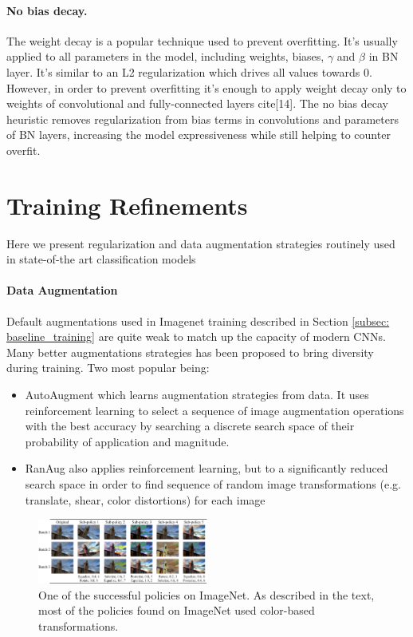 \paragraph{No bias decay.}
The weight decay is a popular technique used to prevent overfitting. It's usually applied to all parameters in the model, including weights, biases, $\gamma$ and $\beta$ in BN layer. It's similar to an L2 regularization which drives all values towards $0$. However, in order to prevent overfitting it's enough to apply weight decay only to weights of convolutional and fully-connected layers cite[14]. The no bias decay heuristic removes regularization from bias terms in convolutions and parameters of BN layers, increasing the model expressiveness while still helping to counter overfit.  


\section{Training Refinements}

Here we present regularization and data augmentation strategies routinely used in state-of-the art classification models \cite{lin2020neural_genet} \cite{tan2019_efficientnet} \cite{tan2021_efficientnetv2}

\paragraph{Data Augmentation}
Default augmentations used in Imagenet training described in Section \ref{subsec: baseline_training} are quite weak to match up the capacity of modern CNNs. Many better augmentations strategies has been proposed to bring diversity during training. Two most popular being: 

\begin{itemize}
    \item AutoAugment \cite{cubuk2018_autoaugment} which learns augmentation strategies from data. It uses reinforcement learning to select a sequence of image augmentation operations with the best accuracy by searching a discrete search space of their probability of application and magnitude.
    \item RanAug \cite{cubuk2020_randaugment} also applies reinforcement learning, but to a significantly reduced search space in order to find sequence of random image transformations (e.g. translate, shear, color distortions) for each image
\end{itemize}

\begin{figure}[ht!]
    \centering
    \includegraphics[width=0.5\textwidth]{images/randaug_policy.png}
    \caption{One of the successful policies on ImageNet. As described in the text, most of the policies found on ImageNet used color-based transformations.}
    \label{fig:randaug}
  \end{figure}

